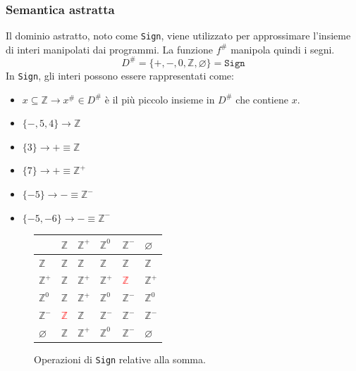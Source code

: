 \subsubsection{Semantica astratta}
Il dominio astratto, noto come \texttt{Sign}, viene utilizzato per approssimare
l'insieme di interi manipolati dai programmi. La funzione $f^\#$ manipola quindi i segni. 
\[
  D^\# = \{+, -, 0, \mathbb{Z}, \varnothing\} = \texttt{Sign}
\]
In \texttt{Sign},
gli interi possono essere rappresentati come:

\begin{itemize}
  \item $x \subseteq \mathbb{Z} \rightarrow x^\# \in D^\#$ è il più piccolo 
  insieme in $D^\#$ che contiene $x$.
  \item \(\{-,5,4 \} \rightarrow \mathbb{Z}\)
  \item \(\{ 3 \} \rightarrow + \equiv \mathbb{Z}\)
  \item \(\{ 7 \}  \rightarrow + \equiv \mathbb{Z}^{+}\)
  \item \(\{-5 \} \rightarrow - \equiv \mathbb{Z}^{-}\)
  \item \( \{ -5, -6 \} \rightarrow - \equiv \mathbb{Z}^{-}\)
\end{itemize}
\begin{minipage}[t]{0.4\textwidth}
  \begin{figure}[H]
  \centering
  \renewcommand{\arraystretch}{2}
  \begin{tabular}{|m{2em}|m{2em}|m{2em}|m{2em}|m{2em}|m{2em}|}
      \hline
       & $\mathbb{Z}$ & $\mathbb{Z}^+$ & $\mathbb{Z}^0$ & $\mathbb{Z}^-$ & $\varnothing$ \\
      \hline
      $\mathbb{Z}$ & $\mathbb{Z}$ & $\mathbb{Z}$ & $\mathbb{Z}$ & $\mathbb{Z}$ & $\mathbb{Z}$ \\
      \hline
      $\mathbb{Z}^+$ & $\mathbb{Z}$ & $\mathbb{Z}^+$ & $\mathbb{Z}^+$ & \textcolor{red}{$\mathbb{Z}$} & $\mathbb{Z}^+$ \\
      \hline
      $\mathbb{Z}^0$ & $\mathbb{Z}$ & $\mathbb{Z}^+$ & $\mathbb{Z}^0$ & $\mathbb{Z}^-$ & $\mathbb{Z}^0$ \\
      \hline
      $\mathbb{Z}^-$ & \textcolor{red}{$\mathbb{Z}$}  & $\mathbb{Z}$ & $\mathbb{Z}^-$ & $\mathbb{Z}^-$ & $\mathbb{Z}^-$ \\
      \hline
      $\varnothing$ & $\mathbb{Z}$ & $\mathbb{Z}^+$ & $\mathbb{Z}^0$ & $\mathbb{Z}^-$ & $\varnothing$ \\
      \hline
    \end{tabular}
    \caption{Operazioni di \texttt{Sign} relative alla somma.}
  \end{figure}
\end{minipage}
